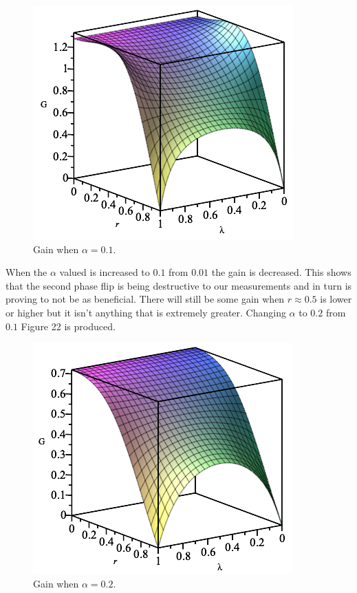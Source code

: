 \documentclass[twocolumn]{article}
\begin{document}
\begin{figure}[ht]
    \centering
    \includegraphics[scale=0.6]{Phase-Flip-Two-Channel-Alpha=01-Gain.png}
    \caption{\footnotesize{Gain when $\alpha=0.1$.}}
    \label{Fig: DPFTCA01G}
\end{figure}
\par \noindent
When the $\alpha$ valued is increased to $0.1$ from $0.01$ the gain is decreased. This shows that the second phase flip is being destructive to our measurements and in turn is proving to not be as beneficial. There will still be some gain when $r\approx0.5$ is lower or higher but it isn't anything that is extremely greater. Changing $\alpha$ to $0.2$ from $0.1$ Figure 22 is produced.
\begin{figure}[ht]
    \centering
    \includegraphics[scale=0.6]{Phase-Flip-Two-Channel-Alpha=02-Gain.png}
    \caption{\footnotesize{Gain when $\alpha=0.2$.}}
    \label{Fig: DPFTCA02G}
\end{figure}
\end{document}
